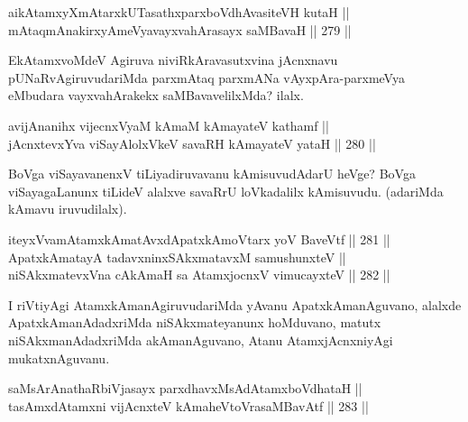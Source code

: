 
\begin{shl}
aikAtamxyXmAtarxkUTasathxparxboVdhAvasiteVH kutaH || \\
mAtaqmAnakirxyAmeVyavayxvahArasayx saMBavaH \hfill || 279 ||  
\end{shl}

\begin{artha}
EkAtamxvoMdeV Agiruva niviRkAravasutxvina jAcnxnavu
pUNaRvAgiruvudariMda parxmAtaq parxmANa vAyxpAra-parxmeVya eMbudara
vayxvahArakekx saMBavavelilxMda? ilalx.
\end{artha}


\begin{shl}
avijAnanihx vijecnxVyaM kAmaM kAmayateV kathamf || \\
jAcnxtevxYva viSayAlolxVkeV savaRH kAmayateV yataH \hfill || 280 ||  
\end{shl}

\begin{artha}
BoVga viSayavanenxV tiLiyadiruvavanu kAmisuvudAdarU heVge? BoVga
viSayagaLanunx tiLideV alalxve savaRrU loVkadalilx kAmisuvudu.
(adariMda kAmavu iruvudilalx).
\end{artha}

\begin{shl}
iteyxVvamAtamxkAmatAvxdApatxkAmoV\s tarx yoV BaveVtf \hfill || 281 ||  \\
ApatxkAmatayA tadavxninxSAkxmatavxM samushunxteV || \\
niSAkxmatevxVna cAkAmaH sa AtamxjocnxV vimucayxteV \hfill || 282 ||  
\end{shl}

\begin{artha}
I riVtiyAgi AtamxkAmanAgiruvudariMda yAvanu ApatxkAmanAguvano, alalxde
ApatxkAmanAdadxriMda niSAkxmateyanunx hoMduvano, matutx
niSAkxmanAdadxriMda akAmanAguvano, Atanu AtamxjAcnxniyAgi
mukatxnAguvanu.
\end{artha}


\begin{shl}
saMsArAnathaRbiVjasayx parxdhavxMsAdAtamxboVdhataH || \\
tasAmxdAtamxni vijAcnxteV kAmaheVtoVrasaMBavAtf \hfill || 283 ||  
\end{shl}

